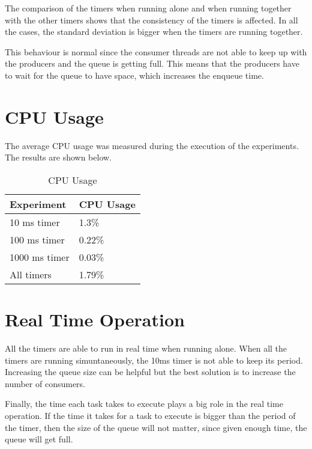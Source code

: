 \documentclass[12pt, a4paper]{report}
\begin{document}
The comparison of the timers when running alone and when running together 
with the other timers shows that the consistency of the timers is affected.
In all the cases, the standard deviation is bigger when the timers are running together.

This behaviour is normal since the consumer threads are not able to keep up with the 
producers and the queue is getting full. This means that the producers have to wait
for the queue to have space, which increases the enqueue time.

\section*{CPU Usage}

The average CPU usage was measured during the execution of the experiments. The results are shown below.

\begin{table}[H]
    \centering
    \begin{tabular}{|l|l|}
    \hline
    \textbf{Experiment} & \textbf{CPU Usage} \\ \hline
    10 ms timer         & 1.3\%              \\ \hline
    100 ms timer        & 0.22\%             \\ \hline
    1000 ms timer       & 0.03\%             \\ \hline
    All timers          & 1.79\%             \\ \hline
    \end{tabular}
    \caption{CPU Usage}
\end{table}


\section*{Real Time Operation}

All the timers are able to run in real time when running alone. When all the timers are
running simuntaneously, the 10ms timer is not able to keep its period. Increasing the 
queue size can be helpful but the best solution is to increase the number of consumers.

Finally, the time each task takes to execute plays a big role in the real time operation.
If the time it takes for a task to execute is bigger than the period of the timer, then
the size of the queue will not matter, since given enough time, the queue will get full.
\end{document}

